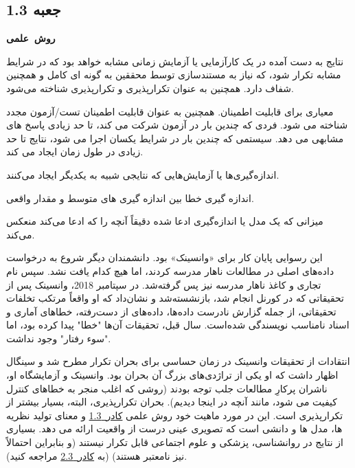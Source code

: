 \begin{tcolorbox}[colback=gray!10,colframe=black]

    \section*{جعبه 1.3}
    \label{sec:جعبه 1.3}
    \begin{Large}
        \textbf{\mbox{روش علمی}}
    \end{Large}
    \newline

    \begin{description}[leftmargin=0.5cm,style=nextline]
        \item[تکرارپذیری:] نتایج به دست آمده در یک کارآزمایی یا آزمایش زمانی مشابه خواهد بود که در شرایط مشابه تکرار شود، که نیاز به مستندسازی توسط محققین به گونه ای کامل و همچنین شفاف دارد.
        همچنین به عنوان تکرارپذیری و تکرارپذیری شناخته می‌شود.
        \item[قابلیت اطمینان:] معیاری برای قابلیت اطمینان.
        همچنین به عنوان قابلیت اطمینان تست/آزمون مجدد شناخته می شود.
        فردی که چندین بار در آزمون شرکت می کند، تا حد زیادی پاسخ های مشابهی می دهد.
        سیستمی که چندین بار در شرایط یکسان اجرا می شود، نتایج تا حد زیادی در طول زمان ایجاد می کند.
        \item[دقت:] اندازه‌گیری‌ها یا آزمایش‌هایی که نتایجی شبیه به یکدیگر ایجاد می‌کنند.
        \item[صحت:] اندازه گیری خطا بین اندازه گیری های متوسط و مقدار واقعی.
        \item[اعتبار:] میزانی که یک مدل یا اندازه‌گیری ادعا شده دقیقاً آنچه را که ادعا می‌کند منعکس می‌کند.
    \end{description}


\end{tcolorbox}


این رسوایی پایان کار برای «وانسینک» بود.
دانشمندان دیگر شروع به درخواست داده‌های اصلی در مطالعات ناهار مدرسه کردند، اما هیچ کدام یافت نشد.
سپس نام تجاری و کاغذ ناهار مدرسه نیز پس گرفته‌شد.
در سپتامبر 2018، وانسینک پس از تحقیقاتی که در کورنل انجام شد، بازنشسته‌شد و نشان‌داد که او واقعاً مرتکب تخلفات تحقیقاتی، از جمله گزارش نادرست داده‌ها، داده‌های از دست‌رفته، خطاهای آماری و اسناد نامناسب نویسندگی شده‌است.
سال قبل، تحقیقات آن‌ها "خطا" پیدا کرده بود، اما "سوء رفتار" وجود نداشت.

انتقادات از تحقیقات وانسینک در زمان حساسی برای بحران تکرار مطرح شد و سینگال اظهار داشت که او یکی از تراژدی‌های بزرگ آن بحران بود.
وانسینک و آزمایشگاه او، ناشران پرکارِ مطالعات جلب توجه بودند (روشی که اغلب منجر به خطاهای کنترل کیفیت می شود، مانند آنچه در اینجا دیدیم).
بحران تکرارپذیری، البته، بسیار بیشتر از تکرارپذیری است.
این در مورد ماهیت خود روش علمی \hyperref[sec:جعبه 1.3]{\mbox{کادر 1.3}} و معنای تولید نظریه ها، مدل ها و دانشی است که تصویری عینی درست از واقعیت ارائه می دهد.
بسیاری از نتایج در روانشناسی، پزشکی و علوم اجتماعی قابل تکرار نیستند (و بنابراین احتمالاً نیز نامعتبر هستند) (به \hyperref[sec:جعبه 2.3]{\mbox{کادر 2.3}} مراجعه کنید).

